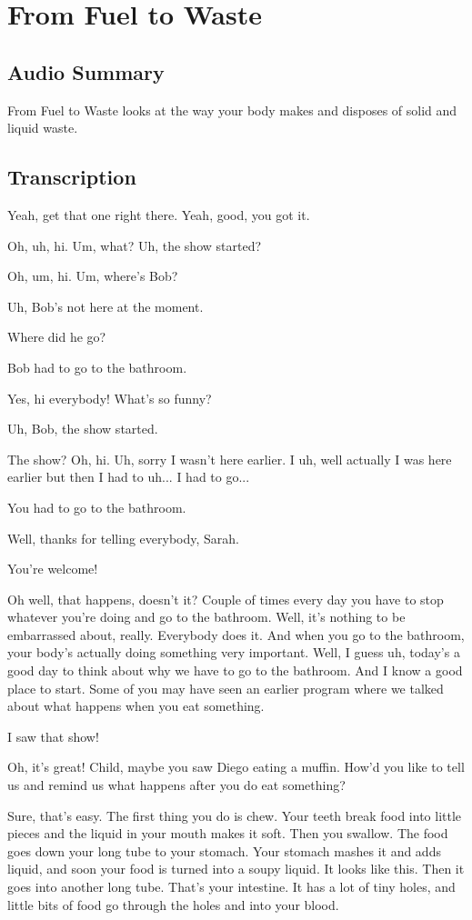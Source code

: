 \section{From Fuel to Waste}

\subsection{Audio Summary}

From Fuel to Waste looks at the way your body makes and disposes of solid and liquid waste.

\subsection{Transcription}

Yeah, get that one right there. Yeah, good, you got it.

Oh, uh, hi. Um, what? Uh, the show started?

Oh, um, hi. Um, where's Bob?

Uh, Bob's not here at the moment.

Where did he go?

Bob had to go to the bathroom.

Yes, hi everybody! What's so funny?

Uh, Bob, the show started.

The show? Oh, hi. Uh, sorry I wasn't here earlier. I uh, well actually I was here earlier but then I had to uh... I had to go...

You had to go to the bathroom.

Well, thanks for telling everybody, Sarah.

You're welcome!

Oh well, that happens, doesn't it? Couple of times every day you have to stop whatever you're doing and go to the bathroom. Well, it's nothing to be embarrassed about, really. Everybody does it. And when you go to the bathroom, your body's actually doing something very important. Well, I guess uh, today's a good day to think about why we have to go to the bathroom. And I know a good place to start. Some of you may have seen an earlier program where we talked about what happens when you eat something.

I saw that show!

Oh, it's great! Child, maybe you saw Diego eating a muffin. How'd you like to tell us and remind us what happens after you do eat something?

Sure, that's easy. The first thing you do is chew. Your teeth break food into little pieces and the liquid in your mouth makes it soft. Then you swallow. The food goes down your long tube to your stomach. Your stomach mashes it and adds liquid, and soon your food is turned into a soupy liquid. It looks like this. Then it goes into another long tube. That's your intestine. It has a lot of tiny holes, and little bits of food go through the holes and into your blood.

